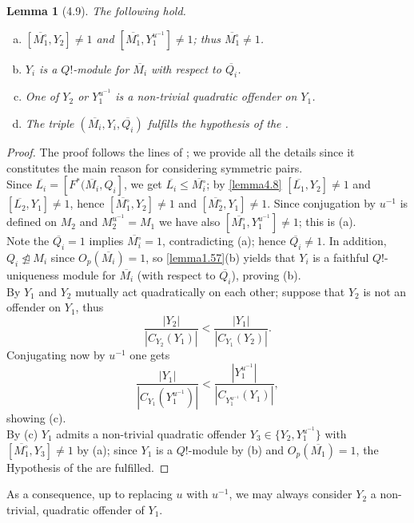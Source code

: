 \documentclass{amsart}
\numberwithin{equation}{section}
\newtheorem{lemma}[equation]{Lemma}
\theoremstyle{definition}
\theoremstyle{subresult}
\theoremstyle{caseresult}
\newcommand{\ov}{\overline}
\newcommand{\norm}{\trianglelefteq}
\newcommand{\inv}{^{-1}}
\newcommand{\<}{\langle}
\renewcommand{\>}{\rangle}
\begin{document}
\begin{lemma}[4.9] \label{lemma4.9}
	The following hold.
	\begin{enumerate}[(a)]
		\item $[\ov{M_1^\circ},Y_2] \ne 1$ and $[\ov{M_1^\circ},Y_1^{u\inv}] \ne 1$; thus $\ov{M_1^\circ} \ne 1$.
		\item $Y_i$ is a $Q!$-module for $\ov{M_i}$ with respect to $\ov{Q_i}$.
		\item One of $Y_2$ or $Y_1^{u\inv}$ is a non-trivial quadratic offender on $Y_1$.
		\item The triple $(\ov{M_i},Y_i,\ov{Q_i})$ fulfills the hypothesis of the . 
	\end{enumerate}
\end{lemma}
\begin{proof}
	The proof follows the lines of \cite[Lemma 4.9]{Meier-Stell-Stroth:2012}; we provide all the details since it constitutes the main reason for considering symmetric pairs.\\
	Since $\ov{L_i}=[F^*(\ov{M_i},Q_i]$, we get $\ov{L_i} \le \ov{M_i^\circ}$; by \ref{lemma4.8} $[\ov{L_1},Y_2] \ne 1$ and $[\ov{L_2},Y_1] \ne 1$, hence $[\ov{M_1^\circ},Y_2] \ne 1$ and $[\ov{M_2^\circ},Y_1] \ne 1$. Since conjugation by $u\inv$ is defined on $M_2$ and $M_2^{u\inv} = M_1$ we have also $[\ov{M_1^\circ},Y_1^{u\inv}] \ne 1$; this is (a).\\
	Note the $\ov{Q_i}=1$ implies $\ov{M_i^\circ}=1$, contradicting (a); hence $\ov{Q_i} \ne 1$. In addition, $Q_i \not \norm M_i$ since $O_p(\ov{M_i}) =1$, so \ref{lemma1.57}(b) yields that $Y_i$ is a faithful $Q!$-uniqueness module for $\ov{M_i}$ (with respect to $\ov{Q_i}$), proving (b).\\
	By \cite[Lemma 4.4]{Meier-Stell-Stroth:2012} $Y_1$ and $Y_2$ mutually act quadratically on each other; suppose that $Y_2$ is not an offender on $Y_1$, thus
	\[
	\frac{|Y_2|}{|C_{Y_2}(Y_1)|} < \frac{|Y_1|}{|C_{Y_1}(Y_2)|}.
	\]
	Conjugating now by $u\inv$ one gets
	\[
	\frac{|Y_1|}{|C_{Y_1}(Y_1^{u\inv})|} < \frac{|Y_1^{u\inv}|}{|C_{Y_1^{u\inv}}(Y_1)|},
	\]
	showing (c).\\
	By (c) $Y_1$ admits a non-trivial quadratic offender $Y_3 \in \{Y_2, Y_1^{u\inv}\}$ with $[\ov{M_1^\circ},Y_3] \ne 1$ by (a); since $Y_1$ is a $Q!$-module by (b) and $O_p(\ov{M_1})=1$, the Hypothesis of the  are fulfilled.
\end{proof}

As a consequence, up to replacing $u$ with $u\inv$, we may always consider $Y_2$ a non-trivial, quadratic offender of $Y_1$.\\
\end{document}
